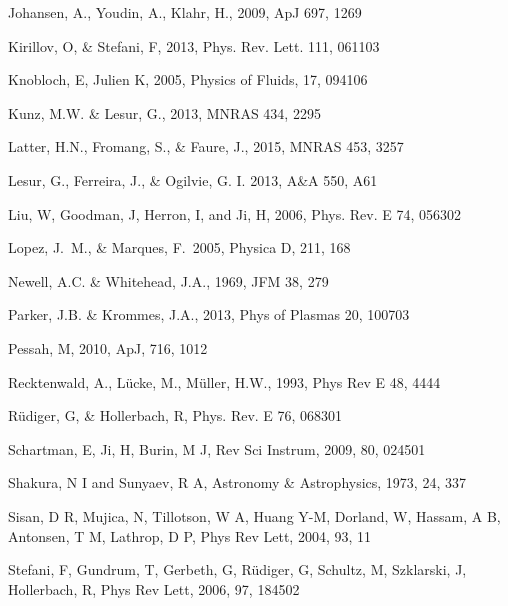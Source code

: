 \documentclass{emulateapj}
\begin{document}
\begin{thebibliography}{53}
Johansen, A., Youdin, A., Klahr, H., 2009, ApJ 697, 1269

Kirillov, O, \& Stefani, F, 2013, Phys. Rev. Lett. 111, 061103

Knobloch, E, Julien K, 2005, Physics of Fluids, 17, 094106

Kunz, M.W. \& Lesur, G., 2013, MNRAS 434, 2295

Latter, H.N., Fromang, S., \& Faure, J., 2015, MNRAS 453, 3257

Lesur, G., Ferreira, J., \& Ogilvie, G. I. 2013, A\&A 550, A61

Liu, W, Goodman, J, Herron, I, and Ji, H, 2006, Phys. Rev. E 74, 056302

Lopez, J.~M., \& Marques, F.\ 2005, Physica D, 211, 168

Newell, A.C. \& Whitehead, J.A., 1969, JFM 38, 279

Parker, J.B. \& Krommes, J.A., 2013, Phys of Plasmas 20, 100703

Pessah, M, 2010, ApJ, 716, 1012

Recktenwald, A., L\"ucke, M., M\"uller, H.W., 1993, Phys Rev E 48, 4444

R\"udiger, G, \& Hollerbach, R, Phys. Rev. E 76, 068301

Schartman, E, Ji, H, Burin, M J, Rev Sci Instrum, 2009, 80, 024501

Shakura, N I and Sunyaev, R A, Astronomy \& Astrophysics, 1973, 24, 337

Sisan, D R, Mujica, N, Tillotson, W A, Huang Y-M, Dorland, W, Hassam, A B, Antonsen, T M, Lathrop, D P, Phys Rev Lett, 2004, 93, 11

Stefani, F, Gundrum, T, Gerbeth, G, R\"udiger, G, Schultz, M, Szklarski, J, Hollerbach, R, Phys Rev Lett, 2006, 97, 184502


\end{thebibliography}
\end{document}
